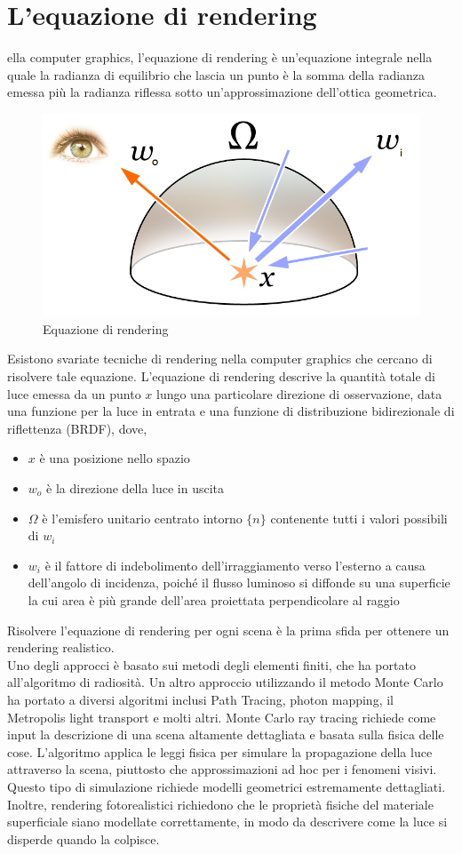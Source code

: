\documentclass[9pt,a4paper,twoside]{tau}
\begin{document}
\section{L'equazione di rendering}
ella computer graphics, l'equazione di rendering è un'equazione integrale nella quale la radianza di equilibrio che lascia un punto è la somma della radianza emessa più la radianza riflessa sotto un'approssimazione dell'ottica geometrica.
\begin{figure}[H]
    \centering
    \includegraphics[width=0.7\columnwidth]{Figures/08.png}
    \caption{Equazione di rendering}
    \label{fig:figure}
\end{figure}
Esistono svariate tecniche di rendering nella computer graphics che cercano di risolvere tale equazione.
L'equazione di rendering descrive la quantità totale di luce emessa da un punto $x$ lungo una particolare direzione di osservazione, data una funzione per la luce in entrata e una funzione di distribuzione bidirezionale di riflettenza (BRDF), dove,
\begin{itemize}
	\item $x$ è una posizione nello spazio
	\item $w_o$ è la direzione della luce in uscita
	\item $\Omega$ è l'emisfero unitario centrato intorno $\{n\}$ contenente tutti i valori possibili di $w_i$
	\item $w_i$ è il fattore di indebolimento dell'irraggiamento verso l'esterno a causa dell'angolo di incidenza, poiché il flusso luminoso si diffonde su una superficie la cui area è più grande dell'area proiettata perpendicolare al raggio
\end{itemize}
Risolvere l'equazione di rendering per ogni scena è la prima sfida per ottenere un rendering realistico. \\
Uno degli approcci è basato sui metodi degli elementi finiti, che ha portato all'algoritmo di radiosità. Un altro approccio utilizzando il metodo Monte Carlo ha portato a diversi algoritmi inclusi Path Tracing, photon mapping, il Metropolis light transport e molti altri. Monte Carlo ray tracing richiede come input la descrizione di una scena altamente dettagliata e basata sulla fisica delle cose. L'algoritmo applica le leggi fisica per simulare la propagazione della luce attraverso la scena, piuttosto che approssimazioni ad hoc per i fenomeni visivi. Questo tipo di simulazione richiede modelli geometrici estremamente dettagliati. Inoltre, rendering fotorealistici richiedono che le proprietà fisiche del materiale superficiale siano modellate correttamente, in modo da descrivere come la luce si disperde quando la colpisce.
\end{document}
